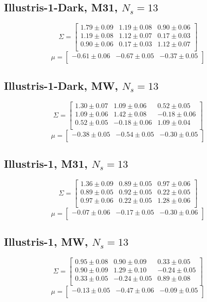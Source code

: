 \documentclass[a4paper,fleqn,usenatbib]{mnras}
\begin{document}
\subsection{Illustris-1-Dark, M31, $N_s=13$}
\[
\Sigma=
\begin{bmatrix}
1.79 \pm 0.09 & 1.19 \pm 0.08 & 0.90 \pm 0.06\\
1.19 \pm 0.08 & 1.12 \pm 0.07 & 0.17 \pm 0.03\\
0.90 \pm 0.06 & 0.17 \pm 0.03 & 1.12 \pm 0.07\\
\end{bmatrix}
\]
\[
\mu=
\begin{bmatrix}
-0.61 \pm 0.06 & -0.67 \pm 0.05 & -0.37 \pm 0.05\\
\end{bmatrix}
\]
\subsection{Illustris-1-Dark, MW, $N_s=13$}
\[
\Sigma=
\begin{bmatrix}
1.30 \pm 0.07 & 1.09 \pm 0.06 & 0.52 \pm 0.05\\
1.09 \pm 0.06 & 1.42 \pm 0.08 & -0.18 \pm 0.06\\
0.52 \pm 0.05 & -0.18 \pm 0.06 & 1.09 \pm 0.04\\
\end{bmatrix}
\]
\[
\mu=
\begin{bmatrix}
-0.38 \pm 0.05 & -0.54 \pm 0.05 & -0.30 \pm 0.05\\
\end{bmatrix}
\]

\subsection{Illustris-1, M31, $N_s=13$}
\[
\Sigma=
\begin{bmatrix}
1.36 \pm 0.09 & 0.89 \pm 0.05 & 0.97 \pm 0.06\\
0.89 \pm 0.05 & 0.92 \pm 0.05 & 0.22 \pm 0.05\\
0.97 \pm 0.06 & 0.22 \pm 0.05 & 1.28 \pm 0.06\\
\end{bmatrix}
\]
\[
\mu=
\begin{bmatrix}
-0.07 \pm 0.06 & -0.17 \pm 0.05 & -0.30 \pm 0.06\\
\end{bmatrix}
\]
\subsection{Illustris-1, MW, $N_s=13$}
\[
\Sigma=
\begin{bmatrix}
0.95 \pm 0.08 & 0.90 \pm 0.09 & 0.33 \pm 0.05\\
0.90 \pm 0.09 & 1.29 \pm 0.10 & -0.24 \pm 0.05\\
0.33 \pm 0.05 & -0.24 \pm 0.05 & 0.89 \pm 0.08\\
\end{bmatrix}
\]
\[
\mu=
\begin{bmatrix}
-0.13 \pm 0.05 & -0.47 \pm 0.06 & -0.09 \pm 0.05\\
\end{bmatrix}
\]
\end{document}
